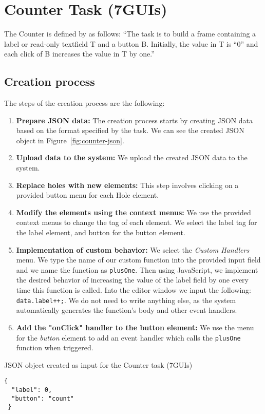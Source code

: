\section{Counter Task (7GUIs)}
The Counter is defined by \citet{7GUIs-web} as follows: ``The task is to build a frame containing a label or read-only textfield T and a button B. Initially, the value in T is “0” and each click of B increases the value in T by one.''

\subsection {Creation process}

The steps of the creation process are the following:
\begin{enumerate}
	\item \textbf{Prepare JSON data:} The creation process starts by creating JSON data based on the format specified by the task.
	      We can see the created JSON object in Figure~\ref{fig:counter-json}.
	\item \textbf{Upload data to the system:} We upload the created JSON data to the system.
	\item \textbf{Replace holes with new elements:} This step involves clicking on a provided button menu for each Hole element.
	\item \textbf{Modify the elements using the context menus:} We use the provided context menus to change the tag of each element.
	      We select the label tag for the label element, and button for the button element.
	\item \textbf{Implementation of custom behavior:} We select the \emph{Custom Handlers} menu.
	      We type the name of our custom function into the provided input field and
	      we name the function as \texttt{plusOne}.
	      Then using JavaScript, we implement the desired behavior of increasing the value of the label field by one
	      every time this function is called.
	      Into the editor window we input the following: \texttt{data.label++;}.
	      We do not need to write anything else, as the system automatically generates the function's body and other event handlers.
	\item \textbf{Add the "onClick" handler to the button element:} We use the menu for the \emph{button} element to add an event handler
	      which calls the \texttt{plusOne} function when triggered.
\end{enumerate}


\begin{listing}[htbp]
	\caption{JSON object created as input for the Counter task (7GUIs)}
	\label{fig:counter-json}
	\begin{lstlisting}
{
  "label": 0,
  "button": "count"
 }
    \end{lstlisting}
\end{listing}

